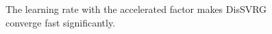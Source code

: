 \documentclass[10pt,journal,finalsubmission,compsoc]{IEEEtran}
\begin{document}
\begin{figure}
\centering
{}
\caption{The learning rate with the accelerated factor makes DisSVRG converge fast significantly.}
\label{figure_evaluation_accelerated_factor}
\end{figure}
\end{document}
